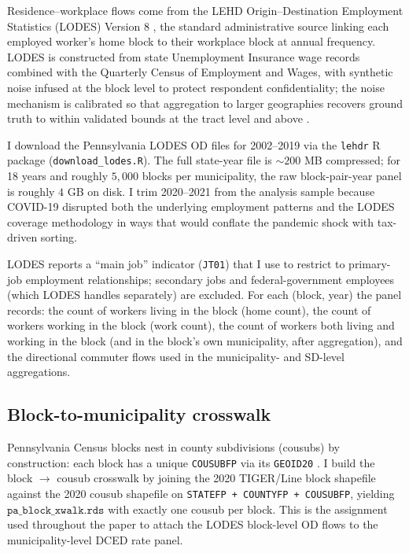 \documentclass[12pt]{article}
\begin{document}
Residence--workplace flows come from the LEHD Origin--Destination
Employment Statistics (LODES) Version 8
\citep{lehdLODES,abowdProducerDynamicsNew2009}, the standard
administrative source linking each employed worker's home block to
their workplace block at annual frequency. LODES is constructed
from state Unemployment Insurance wage records combined with the
Quarterly Census of Employment and Wages, with synthetic noise
infused at the block level to protect respondent confidentiality;
the noise mechanism is calibrated so that aggregation to larger
geographies recovers ground truth to within validated bounds at the
tract level and above \citep{grahamDESIGNCOMPARISONLODES}.

I download the Pennsylvania LODES OD files for 2002--2019 via the
\texttt{lehdr} R package (\texttt{download\_lodes.R}). The full
state-year file is ${\sim}200$ MB compressed; for 18 years and
roughly $5{,}000$ blocks per municipality, the raw block-pair-year panel is
roughly $4$ GB on disk. I trim 2020--2021 from the analysis sample
because COVID-19 disrupted both the underlying employment patterns
and the LODES coverage methodology in ways that would conflate the
pandemic shock with tax-driven sorting.

LODES reports a ``main job'' indicator (\texttt{JT01}) that I use to
restrict to primary-job employment relationships; secondary jobs and
federal-government employees (which LODES handles separately) are
excluded. For each (block, year) the panel records: the count of
workers living in the block (home count), the count of
workers working in the block (work count), the count of
workers both living and working in the block (and in the block's own
municipality, after aggregation), and the directional commuter flows used
in the municipality- and SD-level aggregations.

\subsection{Block-to-municipality crosswalk}
\label{app:data-xwalk}

Pennsylvania Census blocks nest in county subdivisions (cousubs) by
construction: each block has a unique \texttt{COUSUBFP} via its
\texttt{GEOID20} \citep{tigerline2020}. I build the block $\to$
cousub crosswalk by joining the 2020 TIGER/Line block shapefile
against the 2020 cousub shapefile on \texttt{STATEFP +
COUNTYFP + COUSUBFP}, yielding $\texttt{pa\_block\_xwalk.rds}$ with
exactly one cousub per block. This is the assignment used
throughout the paper to attach the LODES block-level OD flows to
the municipality-level DCED rate panel.
\end{document}
